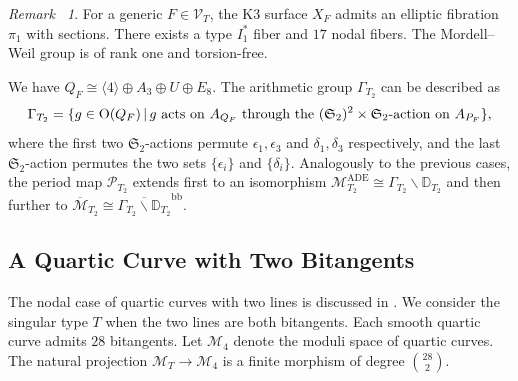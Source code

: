 \documentclass[12pt,reqno,a4paper]{amsart}
\theoremstyle{remark}
\newtheorem{rmk}[thm]{Remark~}
\theoremstyle{definition}
\begin{document}
\begin{rmk}
    For a generic $F\in\mathcal{V}_T$, the K3 surface $X_F$ admits an elliptic fibration $\pi_1$ with sections.
    There exists a type $I_1^*$ fiber and $17$ nodal fibers.
    The Mordell--Weil group is of rank one and torsion-free.
\end{rmk}
            
We have $Q_F\cong \langle 4\rangle\oplus A_3\oplus U\oplus E_8$.
The arithmetic group $\Gamma_{T_2}$ can be described as
\begin{equation*}
    \Gamma_{T_2} = \{ g\in\mathrm{O}(Q_F) \,|\, g \textup{ acts on } A_{Q_F} \textup{ through the } (\mathfrak{S}_2)^2\times\mathfrak{S}_2\textup{-action on } A_{P_F} \},
\end{equation*}
where the first two $\mathfrak{S}_2$-actions permute $\epsilon_1,\epsilon_3$ and $\delta_1,\delta_3$ respectively, and the last $\mathfrak{S}_2$-action permutes the two sets $\{\epsilon_i\}$ and $\{\delta_i\}$. 
Analogously to the previous cases, the period map $\mathscr{P}_{T_2}$ extends first to an isomorphism $\mathcal{M}_{T_2}^{\mathrm{ADE}} \cong \Gamma_{T_2} \backslash \mathbb{D}_{T_2}$ and then further to $\overline{\mathcal{M}}_{T_2} \cong \overline{\Gamma_{T_2} \backslash \mathbb{D}_{T_2}}^{\mathrm{bb}}$. 











\subsection{A Quartic Curve with Two Bitangents}
The nodal case of quartic curves with two lines is discussed in \cite{gallardo2018compactifications}.
We consider the singular type $T$ when the two lines are both bitangents.
Each smooth quartic curve admits $28$ bitangents.
Let $\mathcal{M}_4$ denote the moduli space of quartic curves.
The natural projection $\mathcal{M}_T\to \mathcal{M}_4$ is a finite morphism of degree $\binom{28}{2}$.
\end{document}

